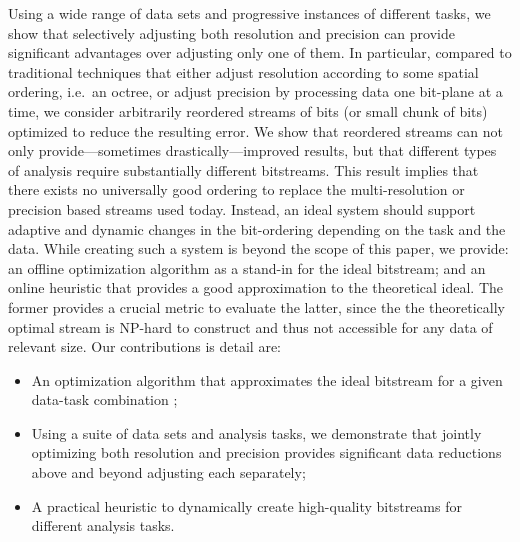 %
%


Using a wide range of data sets and progressive instances of different
tasks, we show that selectively adjusting both resolution and
precision can provide significant advantages over adjusting only one
of them. In particular, compared to traditional techniques that either
adjust resolution according to some spatial ordering, i.e.\ an octree,
or adjust precision by processing data one bit-plane at a time, we
consider arbitrarily reordered streams of bits (or small chunk of bits)
optimized to reduce the resulting error.  We show that reordered
streams can not only provide---sometimes drastically---improved
results, but that different types of analysis require substantially
different bitstreams. This result implies that there exists no
universally good ordering to replace the multi-resolution or precision
based streams used today. Instead, an ideal system should support
adaptive and dynamic changes in the bit-ordering depending on the
task and the data.  While creating such a system is beyond the scope
of this paper, we provide: an offline optimization algorithm as a
stand-in for the ideal bitstream; and an online heuristic that
provides a good approximation to the theoretical ideal. The former
provides a crucial metric to evaluate the latter, since the the
theoretically optimal stream is NP-hard to construct and thus not
accessible for any data of relevant size. Our contributions is detail
are:

\begin{itemize}

\item An optimization algorithm that approximates the ideal bitstream
  for a given data-task combination ;
 
\item Using a suite of data sets and analysis tasks, we demonstrate
  that jointly optimizing both resolution and precision provides
  significant data reductions above and beyond  adjusting each
  separately;

\item A practical heuristic to dynamically create high-quality
  bitstreams for different analysis tasks.

\end{itemize}

